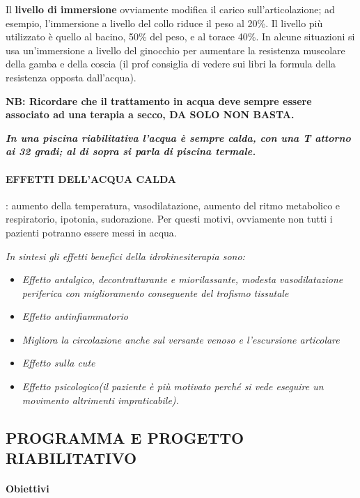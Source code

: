 Il \textbf{livello di immersione} ovviamente modifica il carico
sull'articolazione; ad esempio, l'immersione a livello del collo riduce
il peso al 20\%. Il livello più utilizzato è quello al bacino, 50\% del
peso, e al torace 40\%. In alcune situazioni si usa un'immersione a
livello del ginocchio per aumentare la resistenza muscolare della gamba
e della coscia (il prof consiglia di vedere sui libri la formula della
resistenza opposta dall'acqua).

 
\textbf{NB: Ricordare che il trattamento in acqua deve sempre essere
associato ad una terapia a secco, DA SOLO NON BASTA.}

\textbf{\emph{In una piscina riabilitativa l'acqua è sempre calda, con
una T attorno ai 32 gradi; al di sopra si parla} \emph{di piscina
termale.}}
 

\paragraph{EFFETTI DELL'ACQUA CALDA}: aumento della temperatura,
vasodilatazione, aumento del ritmo metabolico e respiratorio, ipotonia,
sudorazione. Per questi motivi, ovviamente non tutti i pazienti potranno
essere messi in acqua.

 
\emph{In sintesi gli effetti benefici della idrokinesiterapia sono:}
 

\begin{itemize}
\item
  \emph{Effetto antalgico, decontratturante e miorilassante, modesta
  vasodilatazione periferica con miglioramento conseguente del trofismo
  tissutale}
\item
  \emph{Effetto antinfiammatorio}
\item
  \emph{Migliora la circolazione anche sul versante venoso e
  l'escursione articolare}
\item
  \emph{Effetto sulla cute}
\item
  \emph{Effetto psicologico(il paziente è più motivato perché si vede
  eseguire un movimento altrimenti impraticabile).}
\end{itemize}

\subsection{PROGRAMMA E PROGETTO RIABILITATIVO}

\paragraph{Obiettivi}


